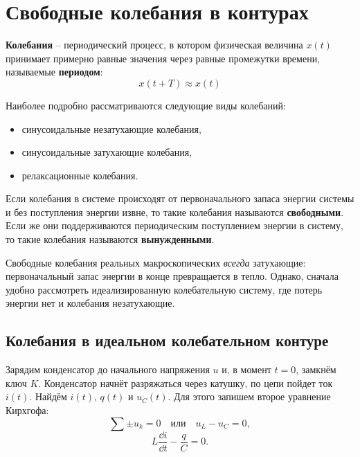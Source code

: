 \chapter{Свободные колебания в контурах}

	\begin{definition}
        \textbf{Колебания} -- периодический процесс, в котором физическая
        величина \( x(t) \) принимает примерно равные значения через равные
        промежутки времени, называемые \textbf{периодом}:
	    \[ x(t + T) \approx x(t) \]
	\end{definition}
	
	Наиболее подробно рассматриваются следующие виды колебаний:
	\begin{itemize}
        \item синусоидальные незатухающие колебания,
        \item синусоидальные затухающие колебания,
        \item релаксационные колебания.
	\end{itemize}
	
	Если колебания в системе происходят от первоначального запаса энергии
    системы и без поступления энергии извне, то такие колебания называются
    \textbf{свободными}. Если же они поддерживаются периодическим поступлением
    энергии в систему, то такие колебания называются \textbf{вынужденными}.
	
	Свободные колебания реальных макроскопических \textit{всегда} затухающие:
    первоначальный запас энергии в конце превращается в тепло. Однако, сначала
    удобно рассмотреть идеализированную колебательную систему, где потерь
    энергии нет и колебания незатухающие.
	
\section{Колебания в идеальном колебательном контуре}

	Зарядим конденсатор до начального напряжения \( u \) и, в момент
    \( t = 0 \), замкнём ключ \( K \). Конденсатор начнёт разряжаться через
    катушку, по цепи пойдет ток \( i(t) \). Найдём \( i(t) \), \( q(t) \) и
    \( u_C(t) \). Для этого запишем второе уравнение Кирхгофа:
	\[
        \sum \pm u_k = 0 \quad \text{или} \quad u_L - u_C = 0,
    \]
	\begin{equation}
		L\frac{\dd i}{\dd t} - \frac{q}{C} = 0.
        \label{eq14:1}
	\end{equation}
	
